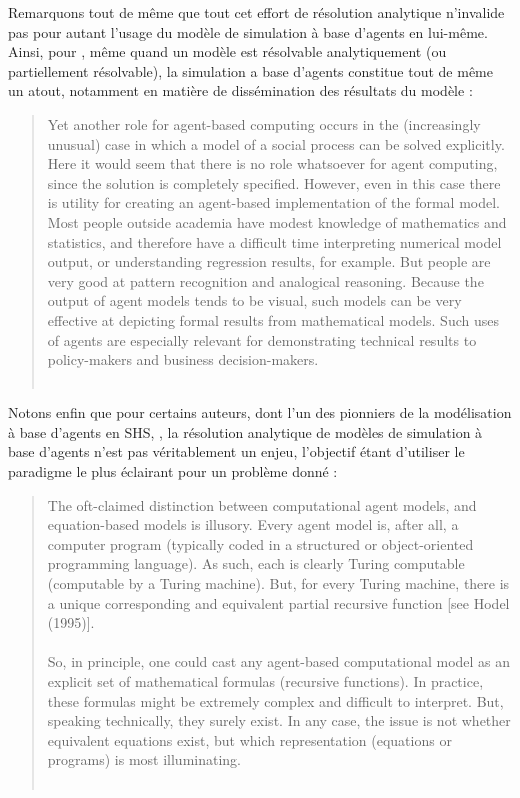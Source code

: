 Remarquons tout de même que tout cet effort de résolution analytique n'invalide pas pour autant l'usage du modèle de simulation à base d'agents en lui-même.
Ainsi, pour \textcite{axtell2000agents}, même quand un modèle est \og résolvable\fg{} analytiquement (ou partiellement résolvable), la simulation a base d'agents constitue tout de même un atout, notamment en matière de dissémination des résultats du modèle :
\begin{quotation}
	\noindent \og
Yet another role for agent-based computing occurs in the (increasingly unusual) case in which a model of a social process can be solved explicitly. 
Here it would seem that there is no role whatsoever for agent computing, since the solution is completely specified.
However, even in this case there is utility for creating an agent-based implementation of the formal model.
Most people outside academia have modest knowledge of mathematics and statistics, and therefore have a difficult time interpreting numerical model output, or understanding regression results, for example.
But people are very good at pattern recognition and analogical reasoning.
Because the output of agent models tends to be visual, such models can be very effective at depicting formal results from mathematical models.
Such uses of agents are especially relevant for demonstrating technical results to policy-makers and business decision-makers.
	\fg{}\\
	\mbox{}~ \hfill \textcite[7]{axtell2000agents}
\end{quotation}
Notons enfin que pour certains auteurs, dont l'un des pionniers de la modélisation à base d'agents en SHS, \textcite{epstein2006remarks}, la résolution analytique de modèles de simulation à base d'agents n'est pas véritablement un enjeu, l'objectif étant d'utiliser le paradigme le plus \og éclairant\fg{} pour un problème donné :
\begin{quotation}
	\noindent \og
	The oft-claimed distinction between computational agent models, and equation-based models is illusory.
	Every agent model is, after all, a computer program (typically coded in a structured or object-oriented programming language).
	As such, each is clearly Turing computable (computable by a Turing machine).
	But, for every Turing machine, there is a unique corresponding and equivalent partial recursive function [see Hodel (1995)].\\
	\textelp{}\\
	So, in principle, one could cast any agent-based computational model as an explicit set of mathematical formulas (recursive functions).
	In practice, these formulas might be extremely complex and difficult to interpret.
	But, speaking technically, they surely exist.\textelp{}
	In any case, the issue is not whether equivalent equations exist, but which representation (equations or programs) is most illuminating.
	\fg{}\\
	\mbox{}~ \hfill \textcite[1590-1591]{epstein2006remarks}
\end{quotation}


